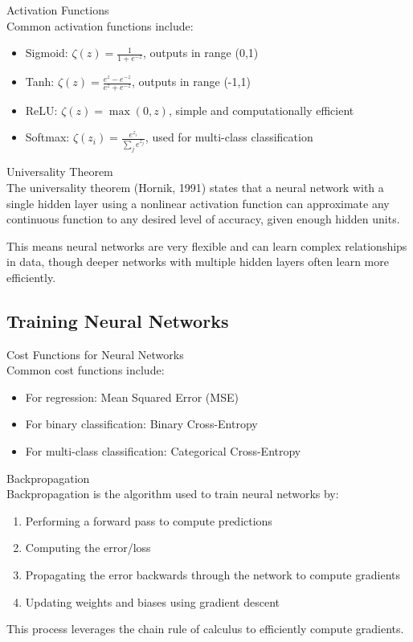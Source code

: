 \begin{definition}{Activation Functions}\\
Common activation functions include:
\begin{itemize}
    \item Sigmoid: $\zeta(z) = \frac{1}{1 + e^{-z}}$, outputs in range (0,1)
    \item Tanh: $\zeta(z) = \frac{e^z - e^{-z}}{e^z + e^{-z}}$, outputs in range (-1,1)
    \item ReLU: $\zeta(z) = \max(0, z)$, simple and computationally efficient
    \item Softmax: $\zeta(z_i) = \frac{e^{z_i}}{\sum_{j} e^{z_j}}$, used for multi-class classification
\end{itemize}
\end{definition}

\begin{concept}{Universality Theorem}\\
The universality theorem (Hornik, 1991) states that a neural network with a single hidden layer using a nonlinear activation function can approximate any continuous function to any desired level of accuracy, given enough hidden units.

This means neural networks are very flexible and can learn complex relationships in data, though deeper networks with multiple hidden layers often learn more efficiently.
\end{concept}

\subsection{Training Neural Networks}

\begin{definition}{Cost Functions for Neural Networks}\\
Common cost functions include:
\begin{itemize}
    \item For regression: Mean Squared Error (MSE)
    \item For binary classification: Binary Cross-Entropy
    \item For multi-class classification: Categorical Cross-Entropy
\end{itemize}
\end{definition}

\begin{definition}{Backpropagation}\\
Backpropagation is the algorithm used to train neural networks by:
\begin{enumerate}
    \item Performing a forward pass to compute predictions
    \item Computing the error/loss
    \item Propagating the error backwards through the network to compute gradients
    \item Updating weights and biases using gradient descent
\end{enumerate}
This process leverages the chain rule of calculus to efficiently compute gradients.
\end{definition}

